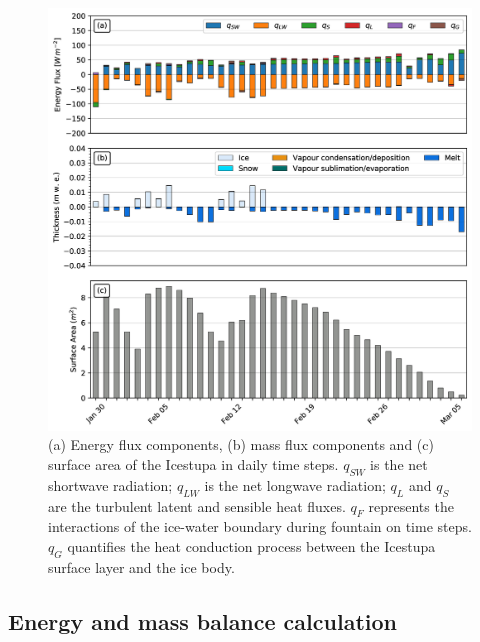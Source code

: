 \documentclass[utf8]{frontiersSCNS} %
\begin{document}
\begin{figure} \begin{center} \includegraphics[width=\linewidth]{Figures/Figure_6.jpg} \end{center} \caption{(a)
    Energy flux components, (b) mass flux components and (c) surface area of the Icestupa in daily time steps.
    $q_{SW}$ is the net shortwave radiation; $q_{LW}$ is the net longwave radiation; $q_{L}$ and $q_{S}$ are the
    turbulent latent and sensible heat fluxes. $q_{F}$ represents the interactions of the ice-water boundary during
fountain on time steps.  $q_{G}$ quantifies the heat conduction process between the Icestupa surface layer and the ice
body. } \label{fig:EB} \end{figure} \subsection{Energy and mass balance calculation}
\end{document}
